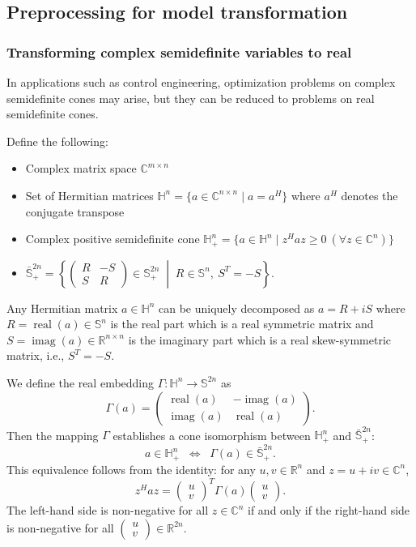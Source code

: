 \subsection{Preprocessing for model transformation}
\subsubsection{Transforming complex semidefinite variables to real}
In applications such as control engineering, optimization problems on complex semidefinite cones may arise, but they can be reduced to problems on real semidefinite cones.

Define the following:
\begin{itemize}
    \item Complex matrix space $\mathbb{C}^{m\times n}$
    \item Set of Hermitian matrices $\mathbb{H}^n=\{a \in \mathbb{C}^{n\times n} \mid a = a^H\}$ where $a^H$ denotes the conjugate transpose
    \item Complex positive semidefinite cone $\mathbb{H}^n_+=\{a \in \mathbb{H}^n \mid z^H a z \geq 0 ~(\forall z\in \mathbb{C}^n)\}$
    \item $\bar{\mathbb{S}}^{2n}_+ = \left\{\left(\begin{smallmatrix}
      R & -S\\
      S & R
  \end{smallmatrix} \right) \in \mathbb{S}^{2n}_+ \;\middle|\; R\in \mathbb{S}^n, ~ S^T=-S\right\}.$
\end{itemize}
Any Hermitian matrix $a \in \mathbb{H}^n$ can be uniquely decomposed as $a = R + iS$ where $R = \operatorname{real}(a) \in \mathbb{S}^n$ is the real part which is a real symmetric matrix and $S = \operatorname{imag}(a) \in \mathbb{R}^{n\times n}$ is the imaginary part which is a real skew-symmetric matrix, i.e., $S^T = -S$.

We define the real embedding $\Gamma: \mathbb{H}^n\to \mathbb{S}^{2n}$ as
\[
  \Gamma(a) 
  = \begin{pmatrix}
       \operatorname{real}(a) & -\operatorname{imag}(a) \\
       \operatorname{imag}(a) & \operatorname{real}(a)
     \end{pmatrix}.
\]
Then the mapping $\Gamma$ establishes a cone isomorphism between $\mathbb{H}^n_+$ and $\bar{\mathbb{S}}^{2n}_+$:
\[
  a\in \mathbb{H}^n_+
   \;\;\Longleftrightarrow\;\;
  \Gamma(a)\in \bar{\mathbb{S}}^{2n}_+.
\]
This equivalence follows from the identity: for any $u,v\in\mathbb{R}^n$ and $z=u+iv\in\mathbb{C}^n$,
\[
  z^H a z = 
  \begin{pmatrix}u\\ v\end{pmatrix}^T \Gamma(a) \begin{pmatrix}u\\ v\end{pmatrix}.
\]
The left-hand side is non-negative for all $z \in \mathbb{C}^n$ if and only if the right-hand side is non-negative for all $(\begin{smallmatrix}u\\v\end{smallmatrix}) \in \mathbb{R}^{2n}$.

